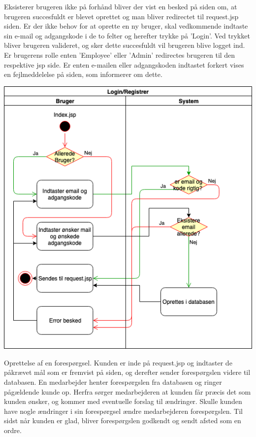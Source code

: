 \documentclass[11pt]{report}
\begin{document}
Eksisterer brugeren ikke på forhånd bliver der vist en besked på siden om, at brugeren succesfuldt er blevet oprettet og man bliver redirectet til request.jsp siden.
Er der ikke behov for at oprette en ny bruger, skal vedkommende indtaste sin e-mail og adgangskode i de to felter og herefter trykke på ’Login’. Ved trykket bliver brugeren valideret, og sker dette succesfuldt vil brugeren blive logget ind. Er brugerens rolle enten ’Employee’ eller ’Admin’ redirectes brugeren til den respektive jsp side.
Er enten e-mailen eller adgangskoden indtastet forkert vises en fejlmeddelelse på siden, som informerer om dette. \\
\begin{center}
\includegraphics[width=14cm]{registrer.png}
\end{center}
Oprettelse af en forespørgsel. Kunden er inde på request.jsp og indtaster de påkrævet mål som er fremvist på siden, og derefter sender forespørgslen videre til databasen. En medarbejder henter forespørgslen fra databasen og ringer pågældende kunde op. Herfra sørger medarbejderen at kunden får præcis det som kunden ønsker, og kommer med eventuelle forslag til ændringer. Skulle kunden have nogle ændringer i sin forespørgsel ændre medarbejderen forespørgslen.
Til sidst når kunden er glad, bliver forespørgslen godkendt og sendt afsted som en ordre.
\end{document}
